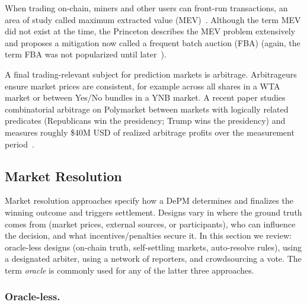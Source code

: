 When trading on-chain, miners and other users can front-run transactions, an area of study called maximum extracted value (MEV)~\cite{BBDGJKLZ19}. Although the term MEV did not exist at the time, the Princeton \depm describes the MEV problem extensively~\cite{BCFKMN14} and proposes a mitigation now called a frequent batch auction (FBA) (again, the term FBA was not popularized until later~\cite{BCS15}).


A final trading-relevant subject for prediction markets is arbitrage. Arbitrageurs ensure market prices are consistent, for example across all shares in a WTA market or between Yes/No bundles in a YNB market. A recent paper studies combinatorial arbitrage on Polymarket between markets with logically related predicates (\eg Republicans win the presidency; Trump wins the presidency) and measures roughly \$40M USD of realized arbitrage profits over the measurement period~\cite{SGKS25}. 



\subsection{Market Resolution}\label{wf:close}

Market resolution approaches specify how a DePM determines and finalizes the winning outcome and triggers settlement. Designs vary in where the ground truth comes from (market prices, external sources, or participants), who can influence the decision, and what incentives/penalties secure it. In this section we review: 
 oracle-less designs (on-chain truth, self-settling markets, auto-resolve rules), using a designated arbiter, using a network of reporters, and crowdsourcing a vote. The term \textit{oracle} is commonly used for any of the latter three approaches.  

\subsubsection{Oracle-less.}

